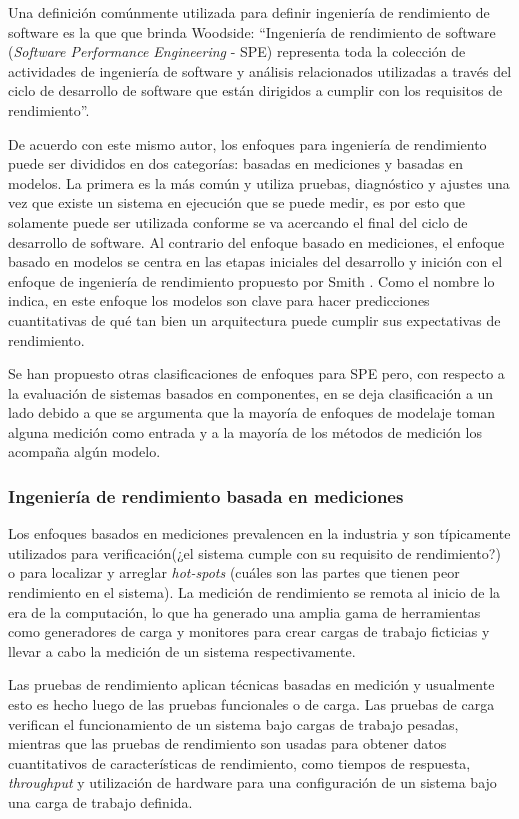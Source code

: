 \documentclass[11pt, twoside]{report}
\begin{document}
Una definición comúnmente utilizada para definir ingeniería de rendimiento de software es la que que brinda Woodside\cite{woodside-et-al}: ``Ingeniería de rendimiento de software (\emph{Software Performance Engineering} - SPE) representa toda la colección de actividades de ingeniería de software y análisis relacionados utilizadas a través del ciclo de desarrollo de software que están dirigidos a cumplir con los requisitos de rendimiento''. 

De acuerdo con este mismo autor, los enfoques para ingeniería de rendimiento puede ser divididos en dos categorías: basadas en mediciones y basadas en modelos. La primera es la más común y utiliza pruebas, diagnóstico y ajustes una vez que existe un sistema en ejecución que se puede medir, es por esto que solamente puede ser utilizada conforme se va acercando el final del ciclo de desarrollo de software. Al contrario del enfoque basado en mediciones, el enfoque basado en modelos se centra en las etapas iniciales del desarrollo y inición con el enfoque de ingeniería de rendimiento propuesto por Smith \cite{thijmen-thesis}. Como el nombre lo indica, en este enfoque los modelos son clave para hacer predicciones cuantitativas de qué tan bien un arquitectura puede cumplir sus expectativas de rendimiento.

Se han propuesto otras clasificaciones de enfoques para SPE pero, con respecto a la evaluación de sistemas basados en componentes, en \cite{performance-model-survey} se deja clasificación a un lado debido a que se argumenta que la mayoría de enfoques de modelaje toman alguna medición como entrada y a la mayoría de los métodos de medición los acompaña algún modelo.


\subsubsection{Ingeniería de rendimiento basada en mediciones}
Los enfoques basados en mediciones prevalencen en la industria\cite{thijmen-thesis} y son típicamente utilizados para verificación(¿el sistema cumple con su requisito de rendimiento?) o para localizar y arreglar \emph{hot-spots} (cuáles son las partes que tienen peor rendimiento en el sistema). La medición de rendimiento se remota al inicio de la era de la computación, lo que ha generado una amplia gama de herramientas como generadores de carga y monitores para crear cargas de trabajo ficticias y llevar a cabo la medición de un sistema respectivamente.

Las pruebas de rendimiento aplican técnicas basadas en medición y usualmente esto es hecho luego de las pruebas funcionales o de carga. Las pruebas de carga verifican el funcionamiento de un sistema bajo cargas de trabajo pesadas, mientras que las pruebas de rendimiento son usadas para obtener datos cuantitativos de características de rendimiento, como tiempos de respuesta, \emph{throughput} y utilización de hardware para una configuración de un sistema bajo una carga de trabajo definida.
\end{document}
